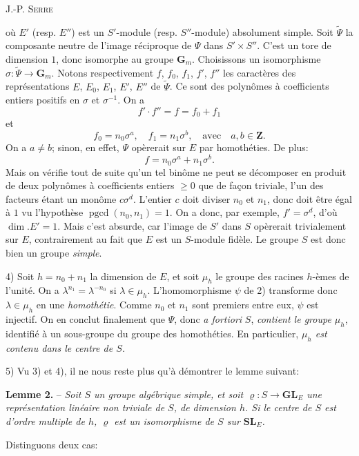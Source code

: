 \begin{center}\small J.-P. \textsc{Serre}\end{center}
où $E'$ (resp. $E''$) est un $S'$-module (resp. $S''$-module) absolument simple. Soit $\widetilde{\varPsi}$ la composante neutre de l’image réciproque de $\varPsi$ dans $S'\times S''$. C’est un tore de dimension $1$, donc isomorphe au groupe $\mathbf{G}_m$. Choisissons un isomorphisme $\sigma:\widetilde{\varPsi}\to\mathbf{G}_m$. Notons respectivement $f$, $f_0$, $f_1$, $f'$, $f''$ les caractères des représentations $E$, $E_0$, $E_1$, $E'$, $E''$ de $\widetilde{\varPsi}$. Ce sont des polynômes à coefficients entiers positifs en $\sigma$ et $\sigma^{-1}$. On a
\[
f'\cdot f''=f=f_0+f_1
\]
et
\[
f_0=n_0\sigma^a,\quad f_1=n_1\sigma^b,\quad\text{avec}\quad a,b\in\mathbf{Z}.
\]
On a $a\ne b$; sinon, en effet, $\varPsi$ opèrerait sur $E$ par homothéties. De plus:
\[
f=n_0\sigma^a+n_1\sigma^b.
\]
Mais on vérifie tout de suite qu’un tel binôme ne peut se décomposer en produit de deux polynômes à coefficients entiers $\geqslant 0$ que de façon triviale, l’un des facteurs étant un monôme $c\sigma^d$. L’entier $c$ doit diviser $n_0$ et $n_1$, donc doit être égal à $1$ vu l’hypothèse $\operatorname{pgcd}(n_0,n_1)=1$. On a donc, par exemple, $f'=\sigma^d$, d’où $\dim. E'=1$. Mais c’est absurde, car l’image de $S'$ dans $S$ opèrerait trivialement sur $E$, contrairement au fait que $E$ est un $S$-module fidèle. Le groupe $S$ est donc bien un groupe \textit{simple}.

4) Soit $h=n_0+n_1$ la dimension de $E$, et soit $\mu_h$ le groupe des racines $h$-èmes de l’unité. On a $\lambda^{n_1}=\lambda^{-n_0}$ si $\lambda\in\mu_h$. L’homomorphisme $\psi$ de 2) transforme donc $\lambda\in\mu_h$ en une \textit{homothétie}. Comme $n_0$ et $n_1$ sont premiers entre eux, $\psi$ est injectif. On en conclut finalement que $\varPsi$, donc \textit{a fortiori} $S$, \textit{contient le groupe $\mu_h$}, identifié à un sous-groupe du groupe des homothéties. En particulier, \textit{$\mu_h$ est contenu dans le centre de $S$.}

5) Vu 3) et 4), il ne nous reste plus qu’à démontrer le lemme suivant:

\textbf{Lemme 2.} -- \textit{Soit $S$ un groupe algébrique simple, et soit $\varrho:S\to\mathbf{GL}_E$ une représentation linéaire non triviale de $S$, de dimension $h$. Si le centre de $S$ est d’ordre multiple de $h$, $\varrho$ est un isomorphisme de $S$ sur $\mathbf{SL}_E$.}

Distinguons deux cas:

